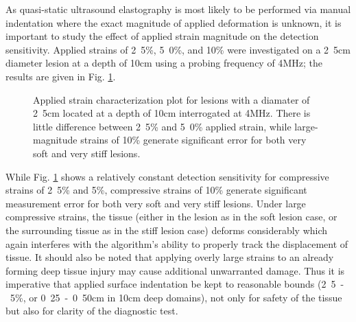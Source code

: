 			As quasi-static ultrasound elastography is most likely to be performed via manual indentation where the exact magnitude of applied deformation is unknown, it is important to study the effect of applied strain magnitude on the detection sensitivity. Applied strains of \unit{2.5}{\%}, \unit{5.0}{\%}, and \unit{10}{\%} were investigated on a \unit{2.5}{cm} diameter lesion at a depth of \unit{10}{cm} using a probing frequency of \unit{4}{MHz}; the results are given in Fig. \ref{fig:strain_characterization}.

			\begin{figure}[!t]
				\centering
				\caption[Applied strain characterization]{Applied strain characterization plot for lesions with a diamater of \unit{2.5}{cm} located at a depth of \unit{10}{cm} interrogated at \unit{4}{MHz}. There is little difference between \unit{2.5}{\%} and \unit{5.0}{\%} applied strain, while large-magnitude strains of \unit{10}{\%} generate significant error for both very soft and very stiff lesions.}
				\label{fig:strain_characterization}
			\end{figure}

			While Fig. \ref{fig:strain_characterization} shows a relatively constant detection sensitivity for compressive strains of \unit{2.5}{\%} and \unit{5}{\%}, compressive strains of \unit{10}{\%} generate significant measurement error for both very soft and very stiff lesions. Under large compressive strains, the tissue (either in the lesion as in the soft lesion case, or the surrounding tissue as in the stiff lesion case) deforms considerably which again interferes with the algorithm's ability to properly track the displacement of tissue. It should also be noted that applying overly large strains to an already forming deep tissue injury may cause additional unwarranted damage. Thus it is imperative that applied surface indentation be kept to reasonable bounds (\unit{2.5 - 5}{\%}, or \unit{0.25 - 0.50}{cm} in \unit{10}{cm} deep domains), not only for safety of the tissue but also for clarity of the diagnostic test.


